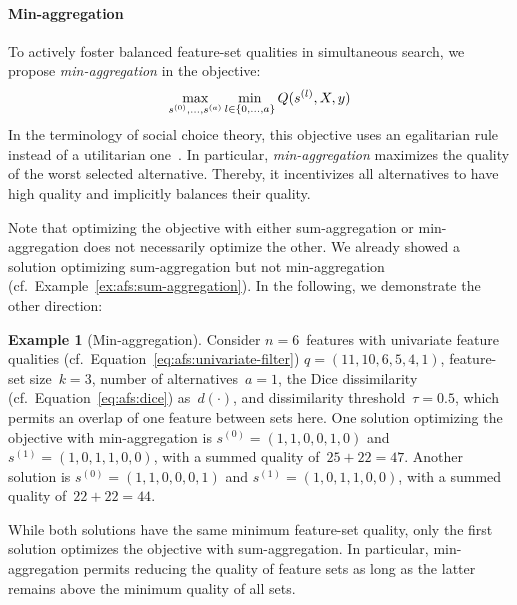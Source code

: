 \documentclass{article}
\theoremstyle{definition}
\newtheorem{example}{Example}
\begin{document}
\paragraph{Min-aggregation}

To actively foster balanced feature-set qualities in simultaneous search, we propose \emph{min-aggregation} in the objective:
%
\begin{equation}
	\max_{s^{(0)}, \dots, s^{(a)}} \min_{l \in \{0, \dots, a\}} Q(s^{(l)},X,y) \\
	\label{eq:afs:afs-simultaneous-min-objective}
\end{equation}
%
In the terminology of social choice theory, this objective uses an egalitarian rule instead of a utilitarian one~\cite{myerson1981utilitarianism}.
In particular, \emph{min-aggregation} maximizes the quality of the worst selected alternative.
Thereby, it incentivizes all alternatives to have high quality and implicitly balances their quality.

Note that optimizing the objective with either sum-aggregation or min-aggregation does not necessarily optimize the other.
We already showed a solution optimizing sum-aggregation but not min-aggregation (cf.~Example~\ref{ex:afs:sum-aggregation}).
In the following, we demonstrate the other direction:
%
\begin{example}[Min-aggregation]
Consider $n=6$~features with univariate feature qualities (cf.~Equation~\ref{eq:afs:univariate-filter}) $q = (11,10,6,5,4,1)$, feature-set size~$k=3$, number of alternatives~$a=1$, the Dice dissimilarity (cf.~Equation~\ref{eq:afs:dice}) as~$d(\cdot)$, and dissimilarity threshold~$\tau = 0.5$, which permits an overlap of one feature between sets here.
One solution optimizing the objective with min-aggregation is $s^{(0)} = (1,1,0,0,1,0)$ and $s^{(1)} = (1,0,1,1,0,0)$, with a summed quality of $\,25+22=47$.
Another solution is $s^{(0)} = (1,1,0,0,0,1)$ and $s^{(1)} = (1,0,1,1,0,0)$, with a summed quality of $\,22+22=44$.
\label{ex:afs:min-aggregation}
\end{example}
%
While both solutions have the same minimum feature-set quality, only the first solution optimizes the objective with sum-aggregation.
In particular, min-aggregation permits reducing the quality of feature sets as long as the latter remains above the minimum quality of all sets.
\end{document}
